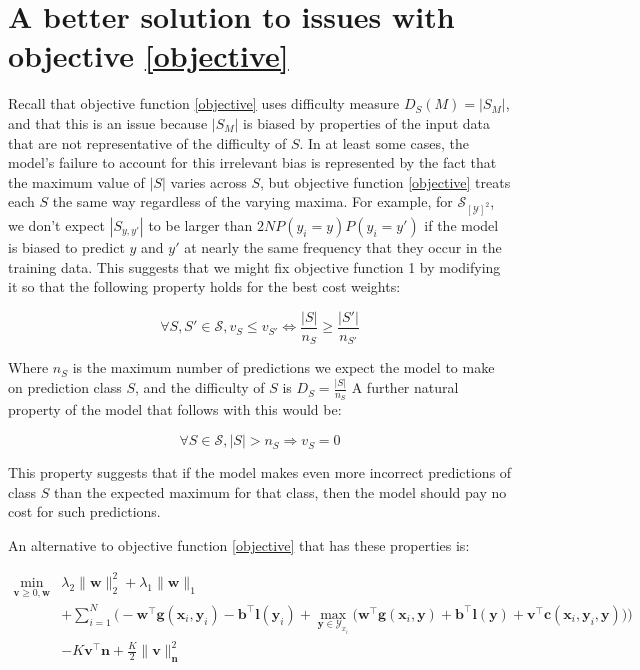 \documentclass[11pt,letterpaper]{article}
\begin{document}
\section{A better solution to issues with objective \ref{objective}}

Recall that objective function \ref{objective} uses difficulty measure
$D_S(M)=|S_M|$, and that this is an issue because $|S_M|$ is biased
by properties of the input data that are not representative of the difficulty
of $S$.  In at least some cases, the model's failure to account for 
this irrelevant bias is represented by the fact that the maximum value 
of $|S|$ varies across $S$, but objective function
\ref{objective} treats each $S$ the same way regardless of the varying
maxima. For example, for $\mathcal{S}_{[\mathcal{Y}]^2}$, we don't expect
$|S_{y,y'}|$ to be larger than $2NP(y_i=y)P(y_i=y')$ if the model is
biased to predict $y$ and $y'$ at nearly the same frequency that
they occur in the training data. This suggests that we might fix
objective function 1 by modifying it so that the following property holds
for the best cost weights:

\begin{equation}
\forall S, S'\in\mathcal{S}, v_S\leq v_{S'}\iff \frac{|S|}{n_S}\geq \frac{|S'|}{n_{S'}}
\end{equation}

Where $n_{S}$ is the maximum number of predictions we expect the model
to make on prediction class $S$, and the difficulty of $S$ is $D_S=\frac{|S|}{n_S}$  A
further natural property of the model that follows with this would be:

\begin{equation}
\forall S\in\mathcal{S}, |S|>n_S\Rightarrow v_S=0
\end{equation}

This property suggests that if the model makes even more incorrect predictions of
class $S$ than the expected maximum for that class, then the model should pay no 
cost for such predictions.

An alternative to objective function \ref{objective} that has these properties is:

\begin{equation}
\begin{split}
\min_{\mathbf{v}\geq 0, \mathbf{w}} & \lambda_2\|\mathbf{w}\|_2^2+\lambda_1\|\mathbf{w}\|_1 \\
& +\sum_{i=1}^N\bigg(-\mathbf{w}^\top \mathbf{g}(\mathbf{x}_i,\mathbf{y}_i)-\mathbf{b}^\top \mathbf{l}(\mathbf{y}_i)+\max_{\mathbf{y}\in \mathcal{Y}_{x_i}}\Big(\mathbf{w}^\top\mathbf{g}(\mathbf{x}_i,\mathbf{y})+\mathbf{b}^\top \mathbf{l}(\mathbf{y})+\mathbf{v}^\top\mathbf{c}(\mathbf{x}_i,\mathbf{y}_i,\mathbf{y})\Big)\bigg) \\
& -K\mathbf{v}^\top\mathbf{n}+\frac{K}{2}\|\mathbf{v}\|^2_\mathbf{n}
\end{split}
\end{equation}
\end{document}
